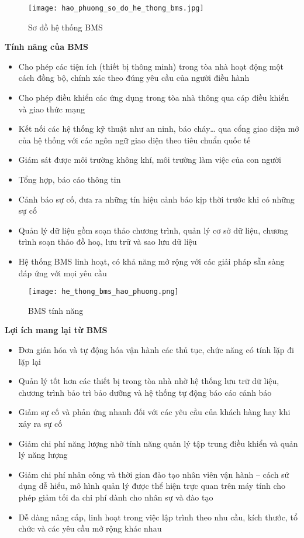 	\begin{figure}[H]
		\centering
		\texttt{[image: hao\_phuong\_so\_do\_he\_thong\_bms.jpg]}	
		\caption{Sơ đồ hệ thống BMS}
	\end{figure}

	\textbf{Tính năng của BMS}
\begin{itemize}
	\item Cho phép các tiện ích (thiết bị thông minh) trong tòa nhà hoạt động một cách đồng bộ, chính xác theo đúng yêu cầu của người điều hành
	
	\item Cho phép điều khiển các ứng dụng trong tòa nhà thông qua cáp điều khiển và giao thức mạng
	
	\item Kết nối các hệ thống kỹ thuật như an ninh, báo cháy… qua cổng giao diện mở của hệ thống với các ngôn ngữ giao diện theo tiêu chuẩn quốc tế
	
	\item Giám sát được môi trường không khí, môi trường làm việc của con người
	
	\item Tổng hợp, báo cáo thông tin
	
	\item Cảnh báo sự cố, đưa ra những tín hiệu cảnh báo kịp thời trước khi có những sự cố
	
	\item Quản lý dữ liệu gồm soạn thảo chương trình, quản lý cơ sở dữ liệu, chương trình soạn thảo đồ hoạ, lưu trữ và sao lưu dữ liệu
	
	\item Hệ thống BMS linh hoạt, có khả năng mở rộng với các giải pháp sẵn sàng đáp ứng với mọi yêu cầu
\end{itemize}

\begin{figure}[H]
	\centering
	\texttt{[image: he\_thong\_bms\_hao\_phuong.png]}	
	\caption{BMS tính năng}
\end{figure}
	
	\break
	\textbf{Lợi ích mang lại từ BMS}
	\begin{itemize}
		\item Đơn giản hóa và tự động hóa vận hành các thủ tục, chức năng có tính lặp đi lặp lại
		\item Quản lý tốt hơn các thiết bị trong tòa nhà nhờ hệ thống lưu trữ dữ liệu, chương trình bảo trì bảo dưỡng và hệ thống tự động báo cáo cảnh báo
		\item Giảm sự cố và phản ứng nhanh đối với các yêu cầu của khách hàng hay khi xảy ra sự cố
		\item Giảm chi phí năng lượng nhờ tính năng quản lý tập trung điều khiển và quản lý năng lượng
		\item Giảm chi phí nhân công và thời gian đào tạo nhân viên vận hành – cách sử dụng dễ hiểu, mô hình quản lý được thể hiện trực quan trên máy tính cho phép giảm tối đa chi phí dành cho nhân sự và đào tạo
		\item Dễ dàng nâng cấp, linh hoạt trong việc lập trình theo nhu cầu, kích thước, tổ chức và các yêu cầu mở rộng khác nhau
	\end{itemize}
	
